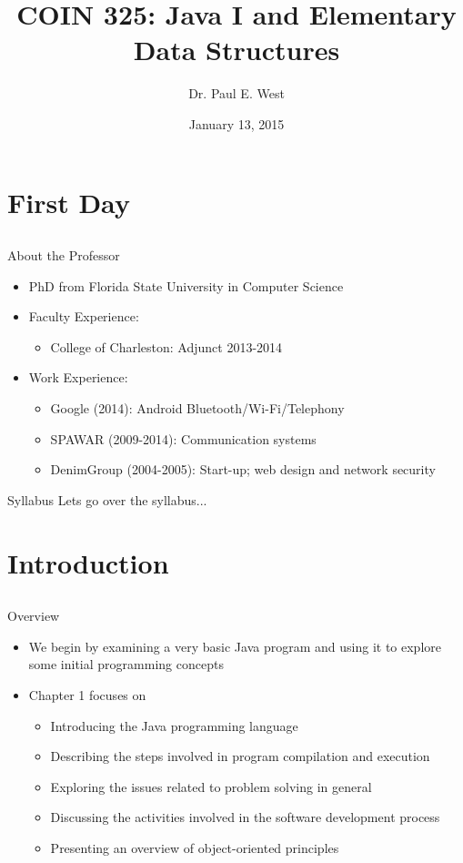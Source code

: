 \documentclass{beamer}
\title{COIN 325: Java I and Elementary Data Structures}
\author{Dr. Paul E. West}
\institute{
  Department of Computer Science\\
  Charleston Southern University
}
\date{January 13, 2015}
\begin{document}
\begin{frame}
  \titlepage
\end{frame}

\section{First Day}
\subsection{}
\begin{frame}{About the Professor}
\begin{itemize}
\item PhD from Florida State University in Computer Science
\item Faculty Experience:
\begin{itemize}
\item College of Charleston: Adjunct 2013-2014
\end{itemize}
\item Work Experience:
\begin{itemize}
\item Google (2014): Android Bluetooth/Wi-Fi/Telephony
\item SPAWAR (2009-2014): Communication systems
\item DenimGroup (2004-2005): Start-up; web design and network security
\end{itemize}
\end{itemize}
\end{frame}

\begin{frame}{Syllabus}
Lets go over the syllabus...
\end{frame}

\section{Introduction}
\subsection{}

\begin{frame}{Overview}
\begin{itemize}
\item We begin by examining a very basic Java program and using it to explore some initial programming concepts
\item Chapter 1 focuses on
\begin{itemize}
\item Introducing the Java programming language
\item Describing the steps involved in program compilation and execution
\item Exploring the issues related to problem solving in general
\item Discussing the activities involved in the software development process
\item Presenting an overview of object-oriented principles
\end{itemize}
\end{itemize}
\end{frame}
\end{document}
